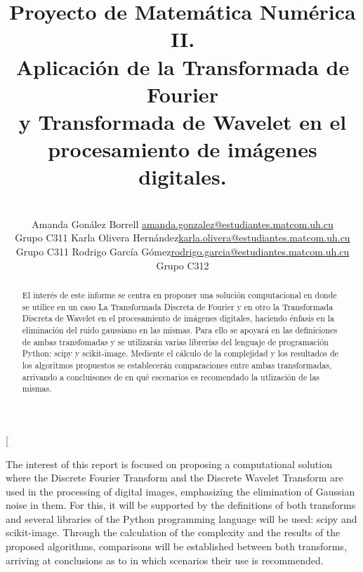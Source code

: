 \documentclass[a4paper,10pt,twocolumn]{article}
\title{Proyecto de Matemática Numérica II.\\ Aplicación de la Transformada de Fourier\\ y Transformada de Wavelet en el\\ procesamiento de imágenes digitales.}
\author{\\
\name Amanda Gonález Borrell \email \href{mailto:amanda.gonzalez@estudiantes.matcom.uh.c}{amanda.gonzalez@estudiantes.matcom.uh.cu}
	\\ \addr Grupo C311 \AND
\name Karla Olivera Hernández\email \href{mailto:karla.olivera@estudiantes.matcom.uh.cu}{karla.olivera@estudiantes.matcom.uh.cu}
  \\ \addr Grupo C311 \AND
\name Rodrigo García Gómez\email \href{mailto:rodrigo.garcia@estudiantes.matcom.uh.cu}{rodrigo.garcia@estudiantes.matcom.uh.cu}
  \\ \addr Grupo C312}
\begin{document}
\twocolumn[

\maketitle


\begin{abstract}

 El interés de este informe se centra en proponer una solución computacional en donde se utilice en un caso La Transformada Discreta de Fourier y en otro la Transformada Discreta de Wavelet en el procesamiento de imágenes digitales, haciendo énfasis en la eliminación del ruido gaussiano en las mismas. Para ello se apoyará en las definiciones de ambas transfomadas y se utilizarán varias librerías del lenguaje de programación Python: scipy y scikit-image. Mediente el cálculo de la complejidad y los resultados de los algoritmos propuestos se establecerán comparaciones entre ambas transformadas, arrivando a concluisones de en qué escenarios es recomendado la utlización de las mismas.
	
\end{abstract}

\vspace{0.5cm}

\begin{enabstract}

 The interest of this report is focused on proposing a computational solution where the Discrete Fourier Transform and the Discrete Wavelet Transform are used in the processing of digital images, emphasizing the elimination of Gaussian noise in them. For this, it will be supported by the definitions of both transforms and several libraries of the Python programming language will be used: scipy and scikit-image. Through the calculation of the complexity and the results of the proposed algorithms, comparisons will be established between both transforms, arriving at conclusions as to in which scenarios their use is recommended.

\end{enabstract}
\end{document}
